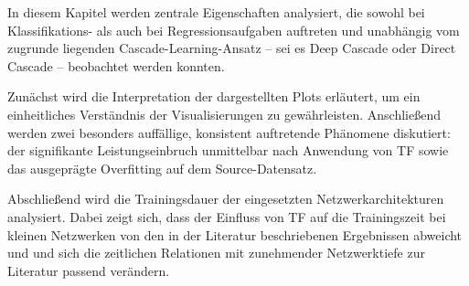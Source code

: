 In diesem Kapitel werden zentrale Eigenschaften analysiert, die sowohl bei Klassifikations- als auch bei Regressionsaufgaben auftreten und 
unabhängig vom zugrunde liegenden Cascade-Learning-Ansatz – sei es Deep Cascade oder Direct Cascade – beobachtet werden konnten.

Zunächst wird die Interpretation der dargestellten Plots erläutert, um ein einheitliches Verständnis der Visualisierungen zu gewährleisten. 
Anschließend werden zwei besonders auffällige, konsistent auftretende Phänomene diskutiert: der signifikante Leistungseinbruch unmittelbar 
nach Anwendung von TF sowie das ausgeprägte Overfitting auf dem Source-Datensatz.

Abschließend wird die Trainingsdauer der eingesetzten Netzwerkarchitekturen analysiert. Dabei zeigt sich, dass der Einfluss von TF 
auf die Trainingszeit bei kleinen Netzwerken von den in der Literatur beschriebenen Ergebnissen abweicht und und sich die 
zeitlichen Relationen mit zunehmender Netzwerktiefe zur Literatur passend verändern.
